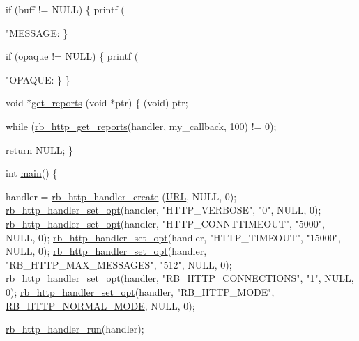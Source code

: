 \begin{DoxyCode}
{{    \textcolor{keywordflow}{if} (buff != NULL) \{
        printf (\textcolor{stringliteral}{"MESSAGE: %
    \}

    \textcolor{keywordflow}{if} (opaque != NULL) \{
        printf (\textcolor{stringliteral}{"OPAQUE: %
    \}
\}

\textcolor{keywordtype}{void} *\hyperlink{rb__http__handler__example_8c_a57c5c030092520363d405723c56b28c2}{get\_reports} (\textcolor{keywordtype}{void} *ptr) \{
    (void) ptr;

    \textcolor{keywordflow}{while} (\hyperlink{rb__http__handler_8c_a890e981b619b1bdd5cc37fa16bb06f06}{rb\_http\_get\_reports}(handler, my\_callback, 100) != 0);

    \textcolor{keywordflow}{return} NULL;
\}

\textcolor{keywordtype}{int} \hyperlink{rb__http__handler__example_8c_ae66f6b31b5ad750f1fe042a706a4e3d4}{main}() \{

    handler = \hyperlink{rb__http__handler_8c_aa338cb73c0754c16c8a05621b995ea59}{rb\_http\_handler\_create} (\hyperlink{rb__http__handler__example_8c_a41d49c9bf1512077295129c1406be4cd}{URL}, NULL, 0);
    \hyperlink{rb__http__handler_8c_ab306abb2b4a66b092205de2677d342aa}{rb\_http\_handler\_set\_opt}(handler, \textcolor{stringliteral}{"HTTP\_VERBOSE"}, \textcolor{stringliteral}{"0"}, NULL, 0);
    \hyperlink{rb__http__handler_8c_ab306abb2b4a66b092205de2677d342aa}{rb\_http\_handler\_set\_opt}(handler, \textcolor{stringliteral}{"HTTP\_CONNTTIMEOUT"}, \textcolor{stringliteral}{"5000"}, NULL, 0);
    \hyperlink{rb__http__handler_8c_ab306abb2b4a66b092205de2677d342aa}{rb\_http\_handler\_set\_opt}(handler, \textcolor{stringliteral}{"HTTP\_TIMEOUT"}, \textcolor{stringliteral}{"15000"}, NULL, 0);
    \hyperlink{rb__http__handler_8c_ab306abb2b4a66b092205de2677d342aa}{rb\_http\_handler\_set\_opt}(handler, \textcolor{stringliteral}{"RB\_HTTP\_MAX\_MESSAGES"}, \textcolor{stringliteral}{"512"}, NULL, 0);
    \hyperlink{rb__http__handler_8c_ab306abb2b4a66b092205de2677d342aa}{rb\_http\_handler\_set\_opt}(handler, \textcolor{stringliteral}{"RB\_HTTP\_CONNECTIONS"}, \textcolor{stringliteral}{"1"}, NULL, 0);
    \hyperlink{rb__http__handler_8c_ab306abb2b4a66b092205de2677d342aa}{rb\_http\_handler\_set\_opt}(handler, \textcolor{stringliteral}{"RB\_HTTP\_MODE"}, 
      \hyperlink{rb__http__handler__example_8c_a271effa2ab356edfe3b4e22d006c975f}{RB\_HTTP\_NORMAL\_MODE}, NULL, 0);

    \hyperlink{rb__http__handler_8c_aec9a18015fc9221b582348ccfb48cb34}{rb\_http\_handler\_run}(handler);

}}}}
\end{DoxyCode}
